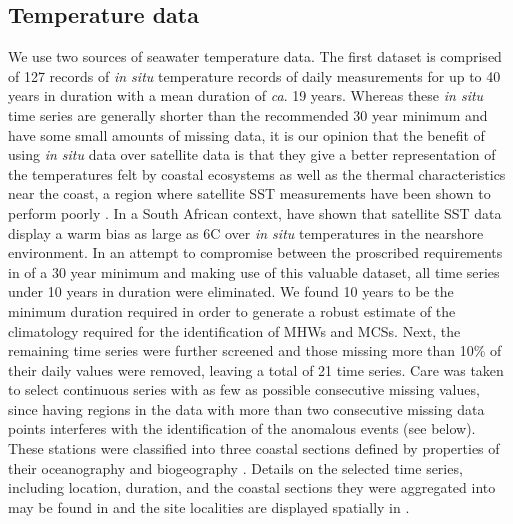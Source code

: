 \documentclass[a4paper,10pt,review]{elsarticle}
\begin{document}
\subsection{Temperature data}
We use two sources of seawater temperature data. The first dataset is comprised of 127 records of \emph{in situ} temperature records of daily measurements for up to 40 years in duration with a mean duration of \emph{ca}. 19 years. Whereas these \emph{in situ} time series are generally shorter than the recommended 30 year minimum \citep{Hobday2016} and have some small amounts of missing data, it is our opinion that the benefit of using \emph{in situ} data over satellite data is that they give a better representation of the temperatures felt by coastal ecosystems as well as the thermal characteristics near the coast, a region where satellite SST measurements have been shown to perform poorly \citep[e.g.][]{Smale2009, Castillo2010}. In a South African context, \citet{Smit2013} have shown that satellite SST data display a warm bias as large as 6\degree C over \emph{in situ} temperatures in the nearshore environment. In an attempt to compromise between the proscribed requirements in \citet{Hobday2016} of a 30 year minimum and making use of this valuable dataset, all time series under 10 years in duration were eliminated. We found 10 years to be the minimum duration required in order to generate a robust estimate of the climatology required for the identification of MHWs and MCSs. Next, the remaining time series were further screened and those missing more than 10\% of their daily values were removed, leaving a total of 21 time series. Care was taken to select continuous series with as few as possible consecutive missing values, since having regions in the data with more than two consecutive missing data points interferes with the identification of the anomalous events (see below). These stations were classified into three coastal sections defined by properties of their oceanography and biogeography \cite{Smit2013}. Details on the selected time series, including location, duration, and the coastal sections they were aggregated into may be found in  and the site localities are displayed spatially in .
\end{document}
